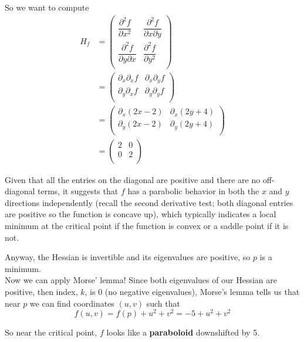 So we want to compute
\begin{align*}
H_f
&=
\begin{pmatrix} 
    \dfrac{\partial^2 f}{\partial x^{2}}         & \dfrac{\partial^2 f}{\partial x \partial y}  \\[2.2ex]
    \dfrac{\partial^2 f}{\partial y \partial x}  & \dfrac{\partial^2 f}{\partial y^{2}}         \\
\end{pmatrix} \\
&= \begin{pmatrix} 
    \partial_x \partial_x f  & \partial_x \partial_y f  \\[2.2ex]
    \partial_y \partial_x f  & \partial_y \partial_y f  \\
\end{pmatrix} \\
&= \begin{pmatrix} 
    \partial_x (2x -2)  & \partial_x (2y + 4)  \\[2.2ex]
    \partial_y (2x -2)  & \partial_y (2y + 4)  \\
\end{pmatrix} \\
&= \begin{pmatrix} 
    2  & 0  \\
    0  & 2  \\
\end{pmatrix}
\end{align*}

Given that all the entries on the diagonal are positive and there are no off-diagonal terms, it suggests that 
$f$ has a parabolic behavior in both the $x$ and $y$ directions independently
(recall the second derivative test; both diagonal entries are positive so the function is concave up),
which typically indicates a local minimum at the critical point if the function is convex or a saddle point if it is not. 

Anyway, the Hessian is invertible and its eigenvalues are positive, so $p$ is a minimum.
\\

Now we can apply Morse' lemma!
Since both eigenvalues of our Hessian are positive, then index, $k$, is 0 (no negative eigenvalues),
Morse's lemma tells us that near $p$ we can find coordinates $(u, v)$ such that
$$
f(u, v) = f(p) + u^2 + v^2 = -5 + u^2 +v^2
$$

So near the critical point, $f$ looks like a \textbf{paraboloid} downshifted by 5.

